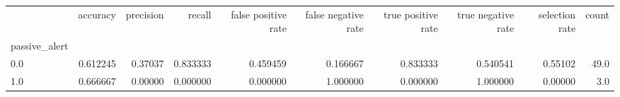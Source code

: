 \begin{tabular}{lrrrrrrrrr}
\toprule
{} &  accuracy &  precision &    recall &  false positive rate &  false negative rate &  true positive rate &  true negative rate &  selection rate &  count \\
passive\_alert &           &            &           &                      &                      &                     &                     &                 &        \\
\midrule
0.0           &  0.612245 &    0.37037 &  0.833333 &             0.459459 &             0.166667 &            0.833333 &            0.540541 &         0.55102 &   49.0 \\
1.0           &  0.666667 &    0.00000 &  0.000000 &             0.000000 &             1.000000 &            0.000000 &            1.000000 &         0.00000 &    3.0 \\
\bottomrule
\end{tabular}
